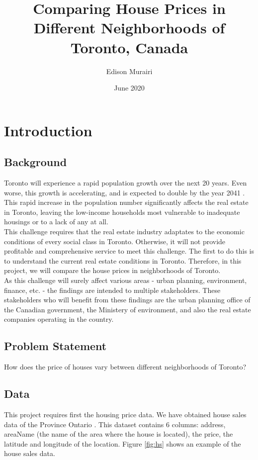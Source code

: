 \documentclass{article}
\title{Comparing House Prices in Different Neighborhoods of Toronto, Canada}
\author{Edison Murairi }
\date{June 2020}
\begin{document}
\maketitle

\section{Introduction}
\subsection{Background}
Toronto will experience a rapid population growth over the next 20 years. Even worse, this growth is accelerating, and is expected to double by the year 2041 \cite{toronto}. This rapid increase in the population number significantly affects the real estate in Toronto, leaving the low-income households most vulnerable to inadequate housings or to a lack of any at all. \\

This challenge requires that the real estate industry adaptates  to the economic conditions of every social class in Toronto. Otherwise, it will not provide profitable and comprehensive service to meet this challenge. The first to do this is to understand the current real estate conditions in Toronto. Therefore, in this project, we will compare the house prices in neighborhoods of Toronto. \\

As this challenge will surely affect various areas - urban planning, environment, finance, etc. - the findings are intended to multiple stakeholders. These stakeholders who will benefit from these findings are the urban planning office of the Canadian government, the Ministery of environment, and also the real estate companies operating in the country.

\subsection{Problem Statement}
How does the price of houses vary between different neighborhoods of Toronto?

\subsection{Data}
This project requires first the housing price data. We have obtained house sales data of the Province Ontario \cite{houses_sale}. This dataset contains 6 columns: address, areaName (the name of the area where the house is located), the price, the latitude and longitude of the location. Figure \ref{fig:hs} shows an example of the house sales data.\\
\end{document}
